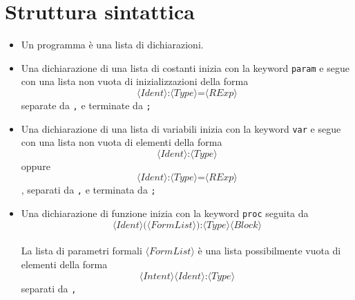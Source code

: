 \documentclass{report}
\newcommand{\nonterm}[1]{\langle #1 \rangle}
\newcommand{\term}[1]{\texttt{#1}}
\begin{document}
\section {Struttura sintattica}

\begin{itemize}
    \item Un programma è una lista di dichiarazioni.
    
    \item Una dichiarazione di una lista di costanti inizia con la keyword
        \texttt{param} e segue con una lista non vuota di inizializzazioni
        della forma $$\nonterm{Ident} \term{:} \nonterm{Type} \term{=} \nonterm{RExp}$$ separate da \texttt{,}
        e terminate da \texttt{;}

    \item Una dichiarazione di una lista di variabili inizia con la keyword
        \texttt{var} e segue con una lista non vuota di elementi della forma
        $$\nonterm{Ident} \term{:} \nonterm{Type}$$ oppure $$\nonterm{Ident} \term{:} \nonterm{Type} \term{=} \nonterm{RExp}$$,
        separati da \texttt{,} e terminata da \texttt{;}

    \item Una dichiarazione di funzione inizia con la keyword \texttt{proc} seguita da
        $$\nonterm{Ident} \term{(} \nonterm{FormList} \term{)} \term{:} \nonterm{Type} \nonterm{Block}$$\\
        La lista di parametri formali $\nonterm{FormList}$ è una lista possibilmente vuota
        di elementi della forma $$\nonterm{Intent} \nonterm{Ident} \term{:} \nonterm{Type}$$ separati
        da \texttt{,}


\end{itemize}
\end{document}
